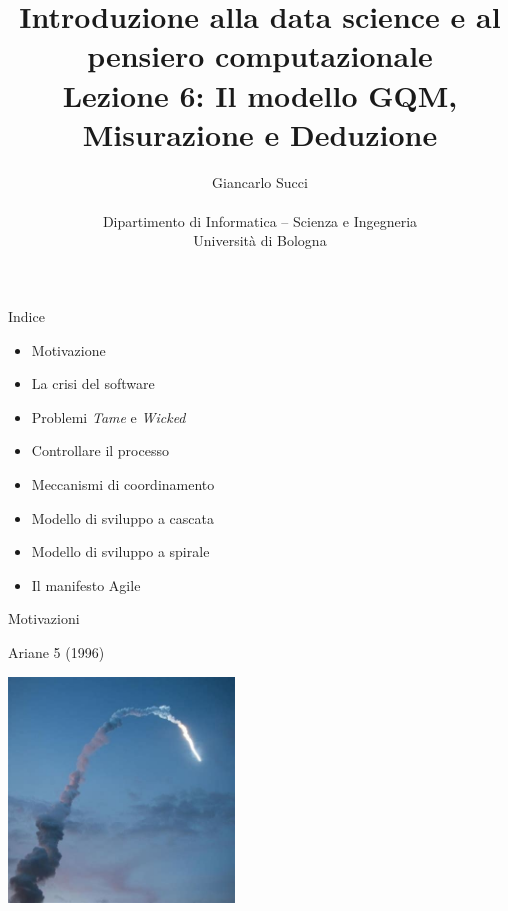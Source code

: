 \documentclass{beamer}
\title[L02]{Introduzione alla data science e al pensiero computazionale\\
Lezione 6: Il modello GQM, Misurazione e Deduzione} %
\author[{\tiny Giancarlo Succi }]{Giancarlo Succi\\\\ Dipartimento di Informatica -- Scienza e Ingegneria\\Universit\`{a} di Bologna\\
\bftt{g.succi@unibo.it}
} %
\institute[unibo] %
\date{} %
\begin{document}
\begin{frame}
\titlepage %

\end{frame}




\begin{frame}
{\centerline{Indice}}
\begin{itemize}
    \item Motivazione
    \item La crisi del software
    \item Problemi \textit{Tame} e \textit{Wicked}
    \item Controllare il processo
    \item Meccanismi di coordinamento
    \item Modello di sviluppo a cascata
    \item Modello di sviluppo a spirale
    \item Il manifesto Agile
\end{itemize} 
\end{frame}

\begin{frame}{\centerline{Motivazioni}}

\begin{center}
{\Large
Ariane 5 (1996)\\
}
\end{center}
\begin{center}
\includegraphics[width=60mm]{A2022.IDSEPC.ProcessoDiProduzione/Ariane5.jpeg}
\end{center}

\end{frame}
\end{document}

